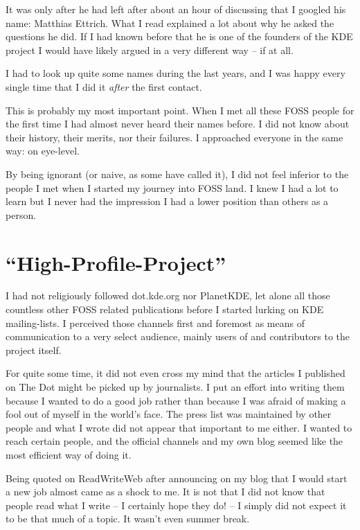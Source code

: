 It was only after he had left after about an hour of discussing that I googled
his name: Matthias Ettrich. What I read explained a lot about why he asked the
questions he did. If I had known before that he is one of the founders of the
KDE project I would have likely argued in a very different way -- if at all.

I had to look up quite some names during the last years, and I was happy every
single time that I did it \textit{after} the first contact.

This is probably my most important point. When I met all these FOSS people for
the first time I had almost never heard their names before. I did not know about
their history, their merits, nor their failures. I approached everyone in the
same way: on eye-level. 

By being ignorant (or naive, as some have called it), I did not feel inferior to
the people I met when I started my journey into FOSS land. I knew I had a lot to
learn but I never had the impression I had a lower position than others as a
person.

\section*{``High-Profile-Project''}

I had not religiously followed dot.kde.org nor PlanetKDE, let alone all those
countless other FOSS related publications before I started lurking on KDE
mailing-lists. I perceived those channels first and foremost as means of
communication to a very select audience, mainly users of and contributors to the
project itself. 

For quite some time, it did not even cross my mind that the articles I published
on The Dot might be picked up by journalists. I put an effort into writing them
because I wanted to do a good job rather than because I was afraid of making a
fool out of myself in the world's face. The press list was maintained by other
people and what I wrote did not appear that important to me either. I wanted to
reach certain people, and the official channels and my own blog seemed like the
most efficient way of doing it.

Being quoted on ReadWriteWeb after announcing on my blog that I would start a
new job almost came as a shock to me. It is not that I did not know that people
read what I write -- I certainly hope they do! -- I simply did not expect it to
be that much of a topic. It wasn't even summer break.

